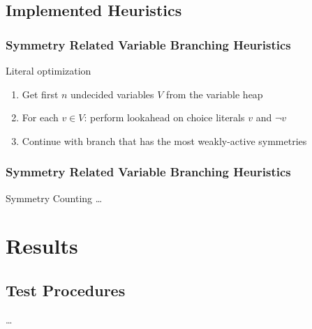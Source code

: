 \documentclass{beamer}
\begin{document}
	\subsection{Implemented Heuristics}
	\begin{frame}
		\frametitle{Symmetry Related Variable Branching Heuristics}

		\begin{block}{Literal optimization}
			\begin{enumerate}
				\item<+-> Get first $n$ undecided variables $V$ from the variable heap
				\item<+-> For each $v \in V$: perform lookahead on choice literals $v$ and $\neg v$
				\item<+-> Continue with branch that has the most weakly-active symmetries
			\end{enumerate}
		\end{block}


	\end{frame}
	
	\begin{frame}
		\frametitle{Symmetry Related Variable Branching Heuristics}

		\begin{block}{Symmetry Counting}
			\dots
		\end{block}

		\visible<+->{
		\begin{block}{Symmetry Usage}
			\ldots
		\end{block}
		}

	\end{frame}

\section{Results}

	\subsection{Test Procedures}
	\begin{frame}
		\ldots
	\end{frame}
	
\end{document}

